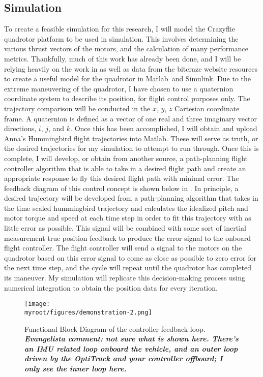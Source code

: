 \documentclass[onecolumn,10pt]{IEEEtran}
\newcommand{\myroot}{../}
\newcommand{\MATLAB}{Matlab}
\begin{document}
\subsection{Simulation}
To create a feasible simulation for this research, I will model the Crazyflie quadrotor platform to be used in simulation. This involves determining the various thrust vectors of the motors, and the calculation of many performance metrics. Thankfully, much of this work has already been done, and I will be relying heavily on the work in \cite{cheng2016flight} as well as data from the bitcraze website resources 
to create a useful model for the quadrotor in \MATLAB\ and Simulink. Due to the extreme maneuvering of the quadrotor, I have chosen to use a quaternion coordinate system to describe its position, for flight control purposes only. The trajectory comparison will be conducted in the $x$, $y$, $z$ Cartesian coordinate frame. A quaternion is defined as a vector of one real and three imaginary vector directions, $i$, $j$, and $k$. Once this has been accomplished, I will obtain and upload Anna’s Hummingbird flight trajectories into \MATLAB. These will serve as truth, or the desired trajectories for my simulation to attempt to run through. Once this is complete, I will develop, or obtain from another source, a path-planning flight controller algorithm that is able to take in a desired flight path and create an appropriate response to fly this desired flight path with minimal error. The feedback diagram of this control concept is shown below in . In principle, a desired trajectory will be developed from a path-planning algorithm that takes in the time scaled hummingbird trajectory and calculates the idealized pitch and motor torque and speed at each time step in order to fit this trajectory with as little error as possible. This signal will be combined with some sort of inertial measurement true position feedback to produce the error signal to the onboard flight controller. The flight controller will send a signal to the motors on the quadrotor based on this error signal to come as close as possible to zero error for the next time step, and the cycle will repeat until the quadrotor has completed its maneuver. My simulation will replicate this decision-making process using numerical integration to obtain the position data for every iteration.
\begin{figure}
\begin{center}
\texttt{[image: \\myroot/figures/demonstration-2.png]}
\end{center}
\caption{Functional Block Diagram of the controller feedback loop. \emph{\textbf{Evangelista comment: not sure what is shown here. There's an IMU related loop onboard the vehicle, and an outer loop driven by the OptiTrack and your controller offboard; I only see the inner loop here.}}}
\label{fig:demonstration-2}
\end{figure}
\end{document}
